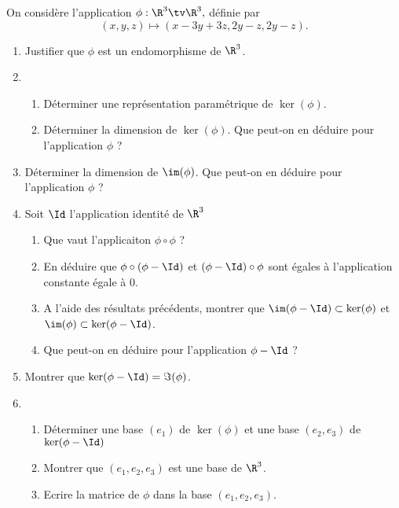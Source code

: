 \begin{exercice}%
On considère l'application $\phi : \R^3 \tv \R^3, $ définie par 
$$(x,y,z) \mapsto (x-3y +3z, 2y-z, 2y-z).$$
\begin{enumerate}
\item Justifier que $\phi$ est un endomorphisme de $\R^3$.
\item
\begin{enumerate}
\item  Déterminer une représentation paramétrique de $\ker(\phi)$. 
\item Déterminer la dimension de $\ker (\phi)$. Que peut-on en déduire pour l'application $\phi$ ?

\end{enumerate}
\item Déterminer la dimension de $\im(\phi)$.  Que peut-on en déduire pour l'application $\phi$ ?
\item Soit $\Id$ l'application identité de $\R^3$
\begin{enumerate}
\item Que vaut l'applicaiton $\phi\circ \phi$ ?
\item En déduire que $\phi\circ (\phi-\Id)$ et $(\phi-\Id) \circ \phi$ sont égales à l'application constante égale à $0$. 
\item A l'aide des résultats précédents, montrer que $\im( \phi - \Id) \subset \ker(\phi)$ et 
$\im( \phi) \subset \ker(\phi- \Id)$.
\item Que peut-on en déduire pour l'application $\phi- \Id$ ? 
\end{enumerate}
\item Montrer que $\ker(\phi-\Id) = \Im(\phi)$.
\item \begin{enumerate}
\item Déterminer une base $(e_1)$  de $\ker(\phi)$ et une base $(e_2,e_3)$ de $\ker(\phi-\Id)$
\item Montrer que $(e_1, e_2, e_3) $ est une base de $\R^3$.
\item Ecrire la matrice de $\phi$ dans la base $(e_1, e_2, e_3) $.
\end{enumerate}
\end{enumerate}
\end{exercice}

